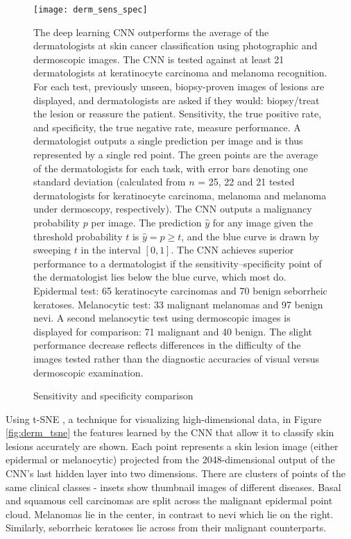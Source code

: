 \begin{figure}
\texttt{[image: derm\_sens\_spec]}
\caption{Sensitivity and specificity comparison}
\vspace{12px}
The deep learning CNN outperforms the average of the dermatologists at skin cancer classification using photographic and dermoscopic images. The CNN is tested against at least 21 dermatologists at keratinocyte carcinoma and melanoma recognition. For each test, previously unseen, biopsy-proven images of lesions are displayed, and dermatologists are asked if they would: biopsy/treat the lesion or reassure the patient. Sensitivity, the true positive rate, and specificity, the true negative rate, measure performance. A dermatologist outputs a single prediction per image and is thus represented by a single red point. The green points are the average of the dermatologists for each task, with error bars denoting one standard deviation (calculated from $n$ = 25, 22 and 21 tested dermatologists for keratinocyte carcinoma, melanoma and melanoma under dermoscopy, respectively). The CNN outputs a malignancy probability $p$ per image. The prediction $\hat{y}$ for any image given the threshold probability $t$ is $\hat{y} = p \geq t$, and the blue curve is drawn by sweeping $t$ in the interval $[0, 1]$. The CNN achieves superior performance to a dermatologist if the sensitivity–specificity point of the dermatologist lies below the blue curve, which most do. Epidermal test: 65 keratinocyte carcinomas and 70 benign seborrheic keratoses. Melanocytic test: 33 malignant melanomas and 97 benign nevi. A second melanocytic test using dermoscopic images is displayed for comparison: 71 malignant and 40 benign. The slight performance decrease reflects differences in the difficulty of the images tested rather than the diagnostic accuracies of visual versus dermoscopic examination.
\label{fig:derm_sens_spec}
\end{figure}

Using t-SNE \cite{van2008visualizing}, a technique for visualizing high-dimensional data, in Figure \ref{fig:derm_tsne} the features learned by the CNN that allow it to classify skin lesions accurately are shown. Each point represents a skin lesion image (either epidermal or melanocytic) projected from the 2048-dimensional output of the CNN’s last hidden layer into two dimensions.  There are clusters of points of the same clinical classes - insets show thumbnail images of different diseases. Basal and squamous cell carcinomas are split across the malignant epidermal point cloud. Melanomas lie in the center, in contrast to nevi which lie on the right. Similarly, seborrheic keratoses lie across from their malignant counterparts. 

